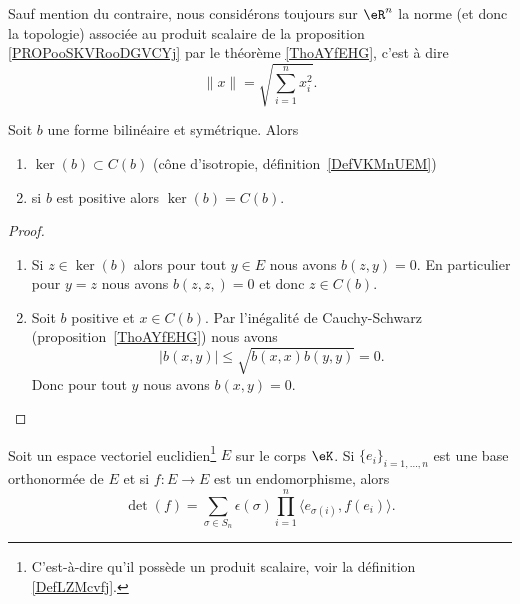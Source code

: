 \begin{definition}        \label{DEFooJAGXooMgaUsR}
	Sauf mention du contraire, nous considérons toujours sur \( \eR^n\) la norme (et donc la topologie) associée au produit scalaire de la proposition \ref{PROPooSKVRooDGVCYj} par le théorème \ref{ThoAYfEHG}, c'est à dire
	\begin{equation}
		\| x \|=\sqrt{ \sum_{i=1}^nx_i^2 }.
	\end{equation}
\end{definition}

\begin{proposition}     \label{PropHIWjdMX}
	Soit \( b\) une forme bilinéaire et symétrique. Alors
	\begin{enumerate}
		\item
		      \( \ker(b)\subset C(b)\) (cône d'isotropie, définition~\ref{DefVKMnUEM})
		\item
		      si \( b\) est positive alors \( \ker(b)=C(b)\).
	\end{enumerate}
\end{proposition}

\begin{proof}
	\begin{enumerate}
		\item
		      Si \( z\in\ker(b)\) alors pour tout \( y\in E\) nous avons \( b(z,y)=0\). En particulier pour \( y=z\) nous avons \( b(z,z,)=0\) et donc \( z\in C(b)\).
		\item
		      Soit \( b\) positive et \( x\in C(b)\). Par l'inégalité de Cauchy-Schwarz (proposition~\ref{ThoAYfEHG}) nous avons
		      \begin{equation}
			      | b(x,y) |\leq \sqrt{   b(x,x)b(y,y) }=0.
		      \end{equation}
		      Donc pour tout \( y\) nous avons \( b(x,y)=0\).
	\end{enumerate}
\end{proof}


\begin{lemma}       \label{LEMooEZFIooXyYybe}
	Soit un espace vectoriel euclidien\footnote{C'est-à-dire qu'il possède un produit scalaire, voir la définition \ref{DefLZMcvfj}.} \( E\) sur le corps \( \eK\). Si \( \{ e_i \}_{i=1,\ldots, n}\) est une base orthonormée de \( E\) et si \( f\colon E\to E\) est un endomorphisme, alors
	\begin{equation}        \label{EQooQAZLooZutFUz}
		\det(f)=\sum_{\sigma\in S_n}\epsilon(\sigma)\prod_{i=1}^n\langle e_{\sigma(i)}, f(e_i)\rangle.
	\end{equation}
\end{lemma}

